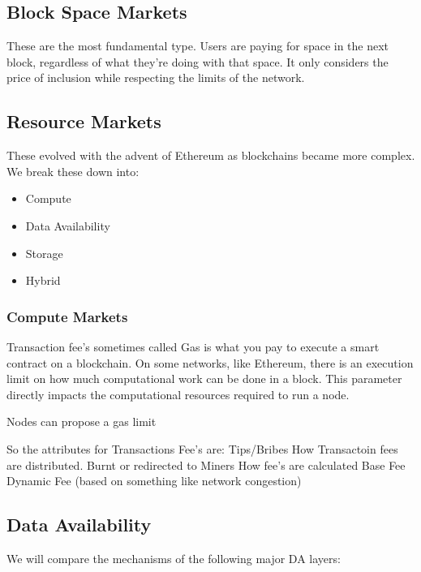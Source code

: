 \documentclass[
  letterpaper,
  DIV=11,
  numbers=noendperiod]{scrreprt}
\providecommand{\tightlist}{%
  \setlength{\itemsep}{0pt}\setlength{\parskip}{0pt}}\usepackage{longtable,booktabs,array}
\begin{document}
\subsection{Block Space Markets}\label{block-space-markets}

These are the most fundamental type. Users are paying for space in the
next block, regardless of what they're doing with that space. It only
considers the price of inclusion while respecting the limits of the
network.

\subsection{Resource Markets}\label{resource-markets}

These evolved with the advent of Ethereum as blockchains became more
complex. We break these down into:

\begin{itemize}
\tightlist
\item
  Compute
\item
  Data Availability
\item
  Storage
\item
  Hybrid
\end{itemize}

\subsubsection{Compute Markets}\label{compute-markets}

Transaction fee's sometimes called Gas is what you pay to execute a
smart contract on a blockchain. On some networks, like Ethereum, there
is an execution limit on how much computational work can be done in a
block. This parameter directly impacts the computational resources
required to run a node.

Nodes can propose a gas limit

So the attributes for Transactions Fee's are: Tips/Bribes How
Transactoin fees are distributed. Burnt or redirected to Miners How
fee's are calculated Base Fee Dynamic Fee (based on something like
network congestion)

\subsection{Data Availability}\label{data-availability}

We will compare the mechanisms of the following major DA layers:
\end{document}
